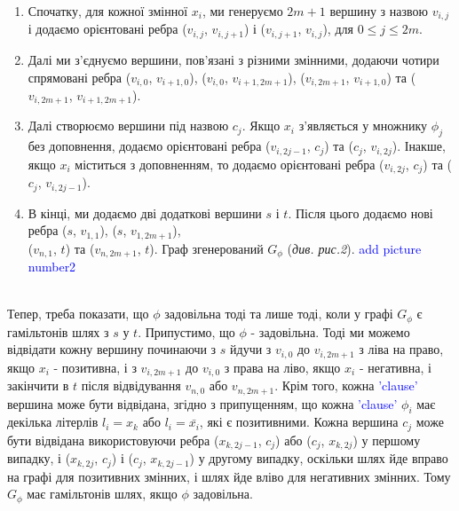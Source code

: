 \documentclass[14pt]{article}
\begin{document}
\begin{spacing}{1.175}
    \begin{enumerate}
        \item  Спочатку, для кожної змінної \(x_i\), ми генеруємо \(2m+1\) вершину з назвою \(v_{i,j}\) і додаємо орієнтовані ребра (\(v_{i,j}\), \(v_{i,j+1}\)) і (\(v_{i,j+1}\), \(v_{i,j}\)), для \(0 \le j \le 2m\).
        
        \item  Далі ми з’єднуємо вершини, пов’язані з різними змінними, додаючи чотири спрямовані ребра (\(v_{i,0}\), \(v_{i+1,0}\)), (\(v_{i,0}\), \(v_{i+1,2m+1}\)), (\(v_{i,2m+1}\), \(v_{i+1,0}\)) та (\(v_{i,2m+1}\), \(v_{i+1,2m+1}\)).
        
        \item  Далі створюємо вершини під назвою \(c_{j}\). Якщо \(x_i\) з'являється у множнику \(\phi_{j}\) без доповнення, додаємо орієнтовані ребра
        (\(v_{i,2j-1}\), \(c_{j}\)) та (\(c_{j}\), \(v_{i,2j}\)). Інакше, якщо \(x_i\) міститься з доповненням, то додаємо орієнтовані ребра (\(v_{i,2j}\), \(c_{j}\)) та (\(c_{j}\), \(v_{i,2j-1}\)).
        
        \item В кінці, ми додаємо дві додаткові вершини \(s\) і \(t\). Після цього додаємо нові ребра (\(s\), \(v_{1,1}\)), (\(s\), \(v_{1,2m+1}\)), \\(\(v_{n,1}\), \(t\)) та (\(v_{n,2m+1}\), \(t\)). Граф згенерований \(G_{\phi}\) (\textit{див. рис.2}). \textcolor{blue}{add picture number2}        
    \end{enumerate}
    \\

    \quad Тепер, треба показати, що \(\phi\) задовільна тоді та лише тоді, коли у графі \(G_{\phi}\) є гамільтонів шлях з \(s\) у \(t\). Припустимо, що \(\phi\) - задовільна. Тоді ми можемо відвідати кожну вершину починаючи з \(s\) йдучи з \(v_{i,0}\) до \(v_{i,2m+1}\) з ліва на право, якщо \(x_i\) - позитивна, і з \(v_{i,2m+1}\) до \(v_{i,0}\) з права на ліво, якщо \(x_i\) - негативна, і закінчити в \(t\) після відвідування \(v_{n,0}\) або \(v_{n,2m+1}\). Крім того, кожна \textcolor{blue}{'clause'} вершина може бути відвідана, згідно з припущенням, що кожна \textcolor{blue}{'clause'} \(\phi_{i}\) має декілька літерлів \(l_i = x_k\) або \(l_i = \bar{x_i}\), які є позитивними. Кожна вершина \(c_j\) може бути відвідана використовуючи ребра (\(x_{k,2j-1}\), \(c_{j}\)) або (\(c_{j}\), \(x_{k,2j}\)) у першому випадку, і (\(x_{k,2j}\), \(c_{j}\)) і (\(c_{j}\), \(x_{k,2j-1}\)) у другому випадку, оскільки шлях йде вправо на графі для позитивних змінних, і шлях йде вліво для негативних змінних. Тому \(G_{\phi}\) має гамільтонів шлях, якщо \(\phi\) задовільна.
    

\end{spacing}
\end{document}
